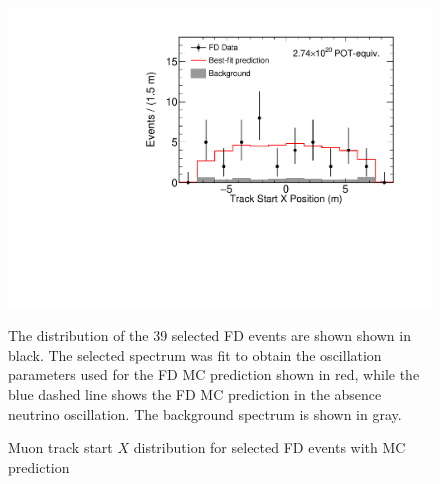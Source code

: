 \begin{figure}
\begin{center}
\includegraphics[width=\textwidth]{figures/results/fd_data_mc_numi_plots/trkStartX_unblind.pdf}
\end{center}
\caption{ Muon track start $X$ distribution for selected FD events with MC prediction }{
The distribution of the 39 selected FD events are shown shown in black.
The selected spectrum was fit to obtain the oscillation parameters used
for the FD MC prediction shown in red, while
the blue dashed line shows the FD MC prediction in the absence neutrino
oscillation.
The background spectrum is shown in gray.
}
\label{trkStartX_unblind}

\end{figure}



